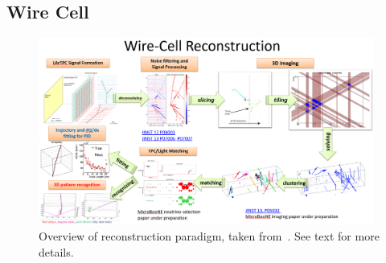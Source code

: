 

\subsection{Wire Cell}

\begin{figure}[!ht]
 \includegraphics[width=0.98\textwidth]{graphics/wire-cell-overview.png}
\caption[Overview of  reconstruction paradigm]{Overview of reconstruction paradigm, taken from~\cite{ref:wc_talk}. 
See text for more details.}
\label{wire-cell-overview}
\end{figure}


